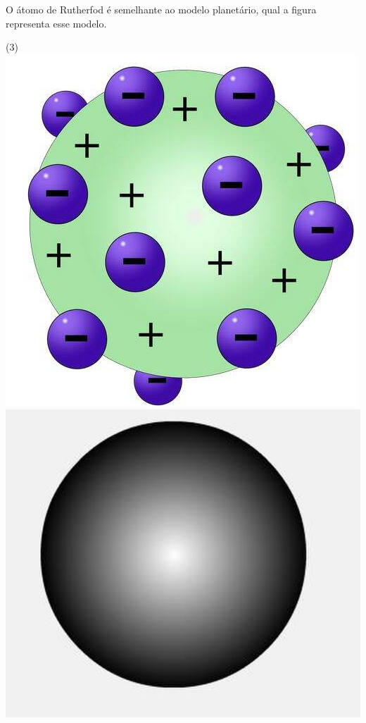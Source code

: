 \documentclass[11pt]{article}
\begin{document}
\begin{exercise}
O átomo de Rutherfod é semelhante ao modelo planetário, qual a figura representa esse modelo.

\begin{choice}(3)
\choice \includegraphics[scale=.6]{Adaptadas/thomson.jpg}
\choice \includegraphics[scale=.1]{Adaptadas/bilhar.png}

\end{choice}
\end{exercise}
\end{document}
